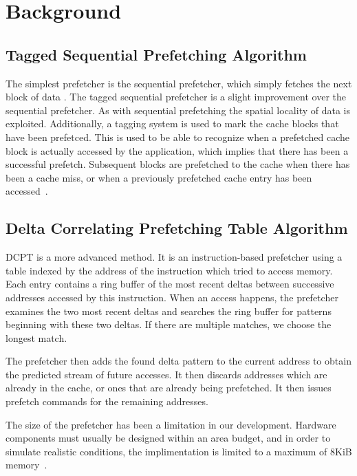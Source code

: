 \section{Background}

\subsection{Tagged Sequential Prefetching Algorithm}

The simplest prefetcher is the sequential prefetcher, which simply fetches the
next block of data \cite{seq}. The tagged sequential prefetcher is a slight
improvement over the sequential prefetcher. As with sequential prefetching the
spatial locality of data is exploited. Additionally, a tagging system is used to
mark the cache blocks that have been prefetced. This is used to be able to
recognize when a prefetched cache block is actually accessed by the application,
which implies that there has been a successful prefetch. Subsequent blocks are
prefetched to the cache when there has been a cache miss, or when a previously
prefetched cache entry has been accessed~\cite{grannaes}.

\subsection{Delta Correlating Prefetching Table Algorithm}

DCPT is a more advanced method. It is an instruction-based prefetcher using a
table indexed by the address of the instruction which tried to access memory.
Each entry contains a ring buffer of the most recent deltas between successive
addresses accessed by this instruction. When an access happens, the prefetcher
examines the two most recent deltas and searches the ring buffer for patterns
beginning with these two deltas. If there are multiple matches, we choose the
longest match.

The prefetcher then adds the found delta pattern to the current address to
obtain the predicted stream of future accesses. It then discards addresses which
are already in the cache, or ones that are already being prefetched. It then
issues prefetch commands for the remaining addresses.


The size of the prefetcher has been a limitation in our development. Hardware
components must usually be designed within an area budget, and in order to
simulate realistic conditions, the implimentation is limited to a maximum of
8KiB memory~\cite{guidelines}.

